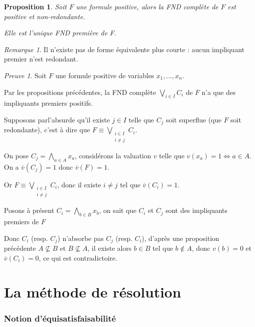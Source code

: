 \documentclass[]{article}
\newtheorem{myproposition}{Proposition}
\theoremstyle{remark}
\newtheorem{myrem}{Remarque}
\newtheorem{myproof}{Preuve}
\theoremstyle{definition}
\begin{document}
\begin{myproposition}
	Soit $F$ une formule positive, alors la FND complète de $F$ est positive et non-redondante.
	
	Elle est l'unique FND première de F.
\end{myproposition}

\begin{myrem}
	Il n'existe pas de forme équivalente plus courte : aucun impliquant premier n'est redondant.
\end{myrem}

\begin{myproof}
	Soit $F$ une formule positive de variables $x_1, ..., x_n$.
	
	Par les propositions précédentes, la FND complète $\displaystyle \bigvee_{i \in I} C_i$ de $F$ n'a que des impliquants premiers positifs.
	
	Supposons parl'absurde qu'il existe $j \in I$ telle que $C_j$ soit superflue (que $F$ soit redondante), c'est à dire que $\displaystyle F \equiv \bigvee_{\substack{i \in I \\ i \neq j}} C_i$.
	
	On pose $\displaystyle C_j = \bigwedge_{a \in A} x_a$, considérons la valuation $v$ telle que $v(x_a) = 1 \Longleftrightarrow a \in A$. On a $\overline{v}(C_j) = 1$ donc $\overline{v}(F)=1$.
	
	Or $\displaystyle F \equiv \bigvee_{\substack{i \in I \\ i \neq j}} C_i$, donc il existe $i \neq j$ tel que $\overline{v}(C_i) = 1$.
	
	Posons à présent $\displaystyle C_i = \bigwedge_{b \in B} x_b$, on sait que $C_i$ et $C_j$ sont des impliquants premiers de $F$
	
	Donc $C_i$ (resp. $C_j$) n'absorbe pas $C_j$ (resp. $C_i$), d'après une proposition précédente $A \not\subseteq B$ et $B \not\subseteq A$, il existe alors $b \in B$ tel que $b \notin A$, donc $v(b) = 0$ et $\overline{v}(C_i)=0$, ce qui est contradictoire.
\end{myproof}

\part{La méthode de résolution}

\section{Notion d'équisatisfaisabilité}
\end{document}
